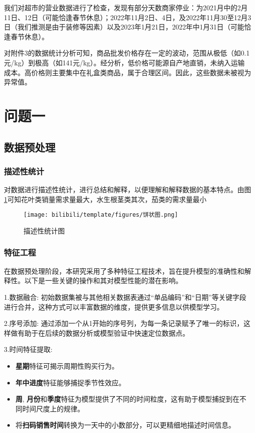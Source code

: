 \documentclass[withoutpreface,bwprint]{cumcmthesis} %
\begin{document}
我们对超市的营业数据进行了检查，发现有部分天数商家停业：为2021月中的2月11日、12日（可能恰逢春节休息）；2022年11月2日、4日，及2022年11月30至12月3日（我们推测是由于装修等因素）以及2023年1月21日，2022年中1月31日（可能恰逢春节休息）。

对附件3的数据统计分析可知，商品批发价格存在一定的波动，范围从极低（如0.1元/kg）到极高（如141元/kg）。经分析，低价格可能源自产地直销，未纳入运输成本。高价格则主要集中在礼盒类商品，属于合理区间。因此，这些数据未被视为异常值。

\section{问题一}

\subsection{数据预处理}
\subsubsection{描述性统计}
对数据进行描述性统计，进行总结和解释，以便理解和解释数据的基本特点。由图\ref{描述性}可知花叶类销量需求量最大，水生根茎类其次，茄类的需求量最小
\begin{figure}[H]%
	\centering
	\texttt{[image: bilibili/template/figures/饼状图.png]}%
    \caption{描述性统计图}
    \label{描述性}%
\end{figure}

\subsubsection{特征工程}
在数据预处理阶段，本研究采用了多种特征工程技术，旨在提升模型的准确性和解释性。以下是一些关键的操作和其对模型性能的潜在影响。

1.数据融合: 初始数据集被与其他相关数据表通过“单品编码”和“日期”等关键字段进行合并，这种方式可以丰富数据的维度，提供更多信息以供模型学习。

2.序号添加: 通过添加一个从1开始的序号列，为每一条记录赋予了唯一的标识，这样做有助于在后续的数据分析或模型验证中快速定位数据点。

3.时间特征提取: 
\begin{itemize}
    \item \textbf{星期}特征可揭示周期性购买行为。
    \item \textbf{年中进度}特征能够捕捉季节性效应。
    \item \textbf{周}, \textbf{月份}和\textbf{季度}特征为模型提供了不同的时间粒度，这有助于模型捕捉到在不同时间尺度上的规律。
    \item 将\textbf{扫码销售时间}转换为一天中的小数部分，可以更精细地描述时间信息。
\end{itemize}
\end{document}
